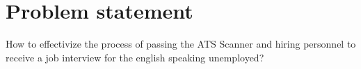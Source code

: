 \section{Problem statement}\label{sec:problem}
How to effectivize the process of passing the ATS Scanner and hiring personnel to receive a job interview for the english speaking unemployed?